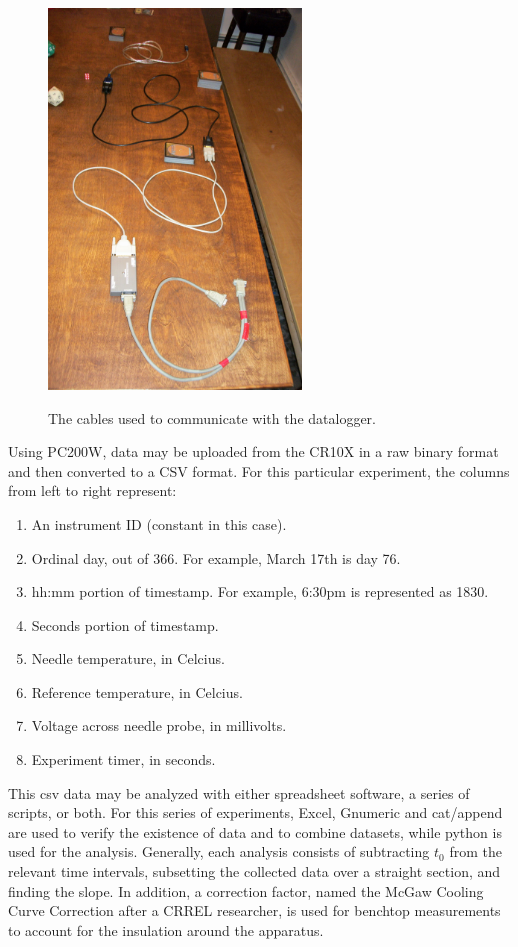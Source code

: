 \begin{figure}[h]
\centering
\includegraphics[width=0.6\textwidth]{fig/cable.jpg}
\label{fig:cable}
\caption{The cables used to communicate with the datalogger.}
\end{figure}

Using PC200W, data may be uploaded from the CR10X in a raw binary format and then
converted to a CSV format. For this particular experiment, the columns from left
to right represent:

\begin{enumerate}
\item An instrument ID (constant in this case).
\item Ordinal day, out of 366. For example, March 17th is day 76.
\item hh:mm portion of timestamp. For example, 6:30pm is represented as 1830.
\item Seconds portion of timestamp.
\item Needle temperature, in Celcius.
\item Reference temperature, in Celcius.
\item Voltage across needle probe, in millivolts.
\item Experiment timer, in seconds.
\end{enumerate}

This csv data may be analyzed with either spreadsheet software, a series of
scripts, or both. For this series of experiments, Excel, Gnumeric and cat/append are used
to verify the existence of data and to combine datasets, while python is used
for the analysis.  Generally, each analysis consists of subtracting \(t_0\)
from the relevant time intervals, subsetting the collected data over a straight
section, and finding the slope.  In addition, a correction factor, named the
McGaw Cooling Curve Correction after a CRREL researcher, is used for benchtop
measurements to account for the insulation around the apparatus.

